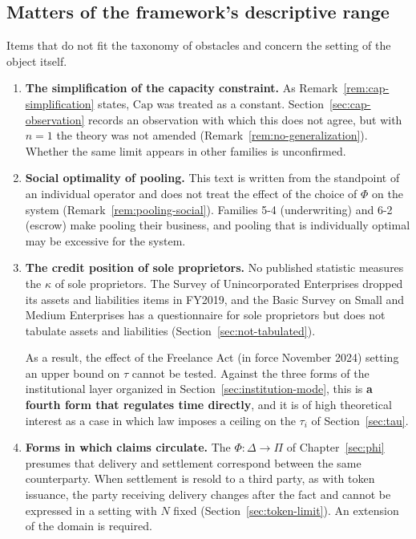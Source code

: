 \subsection{Matters of the framework's descriptive range}

Items that do not fit the taxonomy of obstacles and concern the setting of the object itself.

\begin{enumerate}[label=(\arabic*),start=9]
\item \textbf{The simplification of the capacity constraint.}
As Remark~\ref{rem:cap-simplification} states, $\mathrm{Cap}$ was treated as a constant.
Section~\ref{sec:cap-observation} records an observation with which this does not agree, but
with $n=1$ the theory was not amended (Remark~\ref{rem:no-generalization}). Whether the same
limit appears in other families is unconfirmed.

\item \textbf{Social optimality of pooling.}
This text is written from the standpoint of an individual operator and does not treat the
effect of the choice of $\Phi$ on the system (Remark~\ref{rem:pooling-social}). Families 5-4
(underwriting) and 6-2 (escrow) make pooling their business, and pooling that is individually
optimal may be excessive for the system.

\item \textbf{The credit position of sole proprietors.}
No published statistic measures the $\kappa$ of sole proprietors. The Survey of Unincorporated
Enterprises dropped its assets and liabilities items in FY2019, and the Basic Survey on Small
and Medium Enterprises has a questionnaire for sole proprietors but does not tabulate assets
and liabilities (Section~\ref{sec:not-tabulated}).

As a result, the effect of the Freelance Act (in force November 2024) setting an upper bound
on $\tau$ cannot be tested. Against the three forms of the institutional layer organized in
Section~\ref{sec:institution-mode}, this is \textbf{a fourth form that regulates time
directly}, and it is of high theoretical interest as a case in which law imposes a ceiling on
the $\tau_i$ of Section~\ref{sec:tau}.

\item \textbf{Forms in which claims circulate.}
The $\Phi:\Delta\to\Pi$ of Chapter~\ref{sec:phi} presumes that delivery and settlement
correspond between the same counterparty. When settlement is resold to a third party, as with
token issuance, the party receiving delivery changes after the fact and cannot be expressed
in a setting with $N$ fixed (Section~\ref{sec:token-limit}). An extension of the domain is
required.


\end{enumerate}
